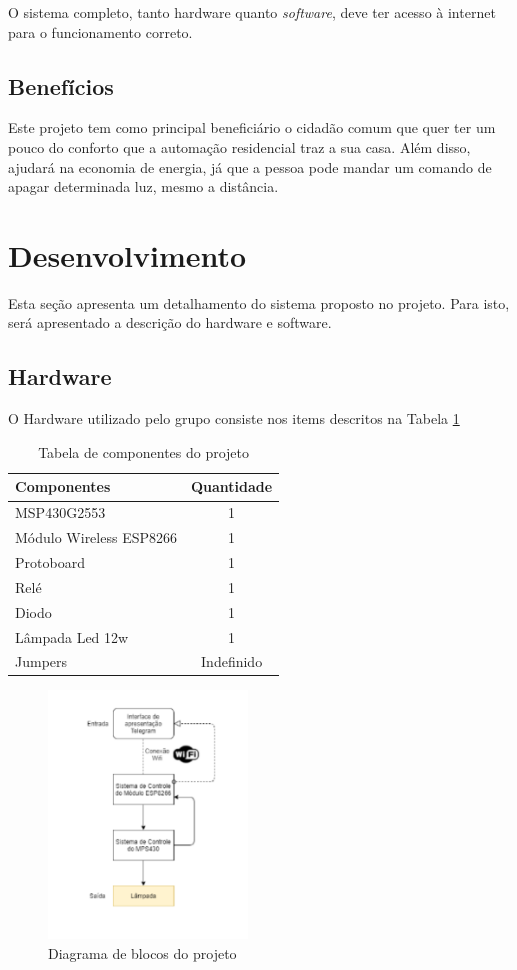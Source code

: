 \documentclass[12pt,journal,compsoc]{IEEEtran}
\begin{document}
O sistema completo, tanto hardware quanto \textit{software}, deve ter acesso à internet para o funcionamento correto.

\subsection{Benefícios}

Este projeto tem como principal beneficiário o cidadão comum que quer ter um pouco do conforto que a automação residencial traz a sua casa. Além disso, ajudará na economia de energia, já que a pessoa pode mandar um comando de apagar determinada luz, mesmo a distância.

\section{Desenvolvimento}

Esta seção apresenta um detalhamento do sistema proposto no projeto. Para isto, será apresentado a descrição do hardware e software.

\subsection{Hardware}

O Hardware utilizado pelo grupo consiste nos items descritos na Tabela \ref{tab:componentes}

\begin{table}[h!]
\centering
\caption{Tabela de componentes do projeto}
\label{tab:componentes}
\begin{tabular}{|l|c|}
\hline
Componentes & Quantidade \\ \hline
MSP430G2553 & 1 \\ \hline
Módulo Wireless ESP8266 & 1 \\ \hline
Protoboard  & 1 \\ \hline
Relé & 1 \\ \hline
Diodo & 1 \\ \hline
Lâmpada Led 12w  & 1 \\ \hline
Jumpers & Indefinido  \\ \hline
\end{tabular}
\end{table}

\begin{figure}[h!]
\centering
\includegraphics[width=200px,height=\textheight,keepaspectratio]{diagrama_blocos}
\caption{Diagrama de blocos do projeto}
\label{fig:diagrama_blocos}
\end{figure}
\end{document}

